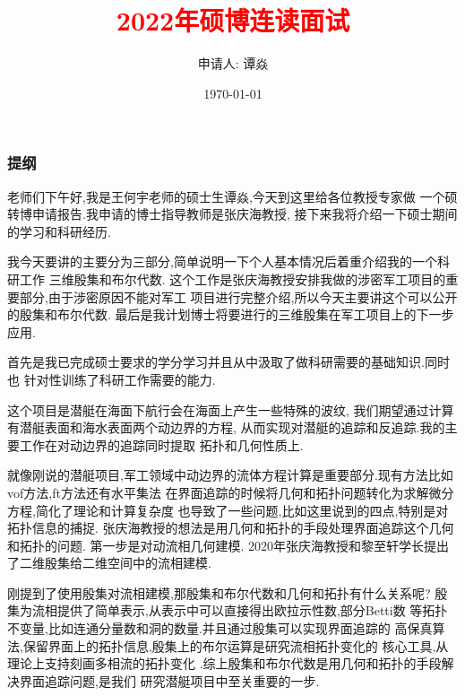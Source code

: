 \documentclass[UTF8]{ctexbeamer}	%
\title{\textcolor{red}{2022年硕博连读面试}}
\author{申请人: 谭焱 
 }
\institute{\small{现硕士导师: 王何宇 、张庆海 \newline 拟转博士指导教师: 张庆海} \newline   \newline 浙江大学数学科学学院}
\date{\today}
\theoremstyle{plain}
\theoremstyle{definition}
\theoremstyle{remark}
\numberwithin{equation}{section}
\begin{document}
\begin{frame}
  \titlepage
\end{frame}


\begin{frame}
  \frametitle{提纲}
  \tableofcontents
\end{frame}

\begin{frame}
  老师们下午好,我是王何宇老师的硕士生谭焱,今天到这里给各位教授专家做
  一个硕转博申请报告.我申请的博士指导教师是张庆海教授,
  接下来我将介绍一下硕士期间的学习和科研经历.
\end{frame}

\begin{frame}
  我今天要讲的主要分为三部分,简单说明一下个人基本情况后着重介绍我的一个科研工作
  三维殷集和布尔代数.
  这个工作是张庆海教授安排我做的涉密军工项目的重要部分,由于涉密原因不能对军工
  项目进行完整介绍,所以今天主要讲这个可以公开的殷集和布尔代数.
  最后是我计划博士将要进行的三维殷集在军工项目上的下一步应用.
\end{frame}

\begin{frame}
  首先是我已完成硕士要求的学分学习并且从中汲取了做科研需要的基础知识.同时也
  针对性训练了科研工作需要的能力.
\end{frame}

\begin{frame}
  这个项目是潜艇在海面下航行会在海面上产生一些特殊的波纹,
  我们期望通过计算有潜艇表面和海水表面两个动边界的方程,
  从而实现对潜艇的追踪和反追踪.我的主要工作在对动边界的追踪同时提取
  拓扑和几何性质上.
\end{frame}

\begin{frame}
  就像刚说的潜艇项目,军工领域中动边界的流体方程计算是重要部分.现有方法比如
  vof方法,ft方法还有水平集法
  在界面追踪的时候将几何和拓扑问题转化为求解微分方程,简化了理论和计算复杂度
  也导致了一些问题,比如这里说到的四点,特别是对拓扑信息的捕捉.
  张庆海教授的想法是用几何和拓扑的手段处理界面追踪这个几何和拓扑的问题.
  第一步是对动流相几何建模.
  2020年张庆海教授和黎至轩学长提出了二维殷集给二维空间中的流相建模.
\end{frame}

\begin{frame}
  刚提到了使用殷集对流相建模,那殷集和布尔代数和几何和拓扑有什么关系呢?
  殷集为流相提供了简单表示,从表示中可以直接得出欧拉示性数,部分Betti数
  等拓扑不变量,比如连通分量数和洞的数量.并且通过殷集可以实现界面追踪的
  高保真算法,保留界面上的拓扑信息,殷集上的布尔运算是研究流相拓扑变化的
  核心工具,从理论上支持刻画多相流的拓扑变化
  .综上殷集和布尔代数是用几何和拓扑的手段解决界面追踪问题,是我们
  研究潜艇项目中至关重要的一步.
\end{frame}
\end{document}
